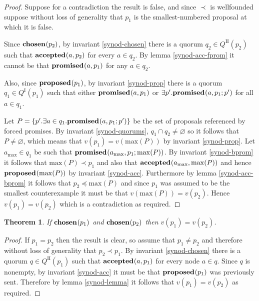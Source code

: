 \documentclass[journal]{IEEEtran}
\newtheorem{theorem}{Theorem}
\begin{document}
\begin{proof}Suppose for a contradiction the result is false, and since $\prec$
is wellfounded suppose without loss of generality that $p_1$ is the
smallest-numbered proposal at which it is false.

Since $\mathbf{chosen}_{}(p_2)$, by invariant \ref{synod-chosen} there is a quorum $q_2
\in Q^\textrm{II}(p_2)$ such that $\mathbf{accepted}_{}(a,p_2)$ for every $a \in q_2$. By
lemma \ref{synod-acc-fprom} it cannot be that $\mathbf{promised}_{}(a,p_1)$ for any $a \in
q_2$.

Also, since $\mathbf{proposed}_{}(p_1)$, by invariant \ref{synod-prop} there is a quorum $q_1
\in Q^\textrm{I}(p_1)$ such that either $\mathbf{promised}_{}(a,p_1)$ or $\exists p'.
\mathbf{promised}_{}(a,p_1;p')$ for all $a \in q_1$.

Let $P = \{ p'. \exists a \in q_1.  \mathbf{promised}_{}(a,p_1;p') \}$ be the set of
proposals referenced by forced promises. By invariant \ref{synod-quorums}, $q_1
\cap q_2 \ne \varnothing$ so it follows that $P \ne \varnothing$, which means
that $v(p_1) = v(\mathrm{max}(P))$ by invariant \ref{synod-prop}. Let
$a_{\mathrm{max}} \in q_1$ be such that
$\mathbf{promised}_{}(a_{\mathrm{max}},p_1;\mathrm{max}(P))$. By invariant
\ref{synod-bprom} it follows that $\mathrm{max}(P) \prec p_1$ and also that
$\mathbf{accepted}_{}(a_{\mathrm{max}},\mathrm{max}(P))$ and hence $\mathbf{proposed}_{}(\mathrm{max}(P))$ by
invariant \ref{synod-acc}. Furthermore by lemma \ref{synod-acc-bprom} it
follows that $p_2 \preceq \mathrm{max}(P)$ and since $p_1$ was assumed to be
the smallest counterexample it must be that $v(\mathrm{max}(P)) = v(p_2)$.
Hence $v(p_1) = v(p_2)$ which is a contradiction as required.  \end{proof}

\begin{theorem}\label{synod-safety-theorem} If $\mathbf{chosen}_{}(p_1)$ and
$\mathbf{chosen}_{}(p_2)$ then $v(p_1) = v(p_2)$.  \end{theorem}

\begin{proof} If $p_1 = p_2$ then the result is clear, so assume that $p_1 \ne
p_2$ and therefore without loss of generality that $p_2 \prec p_1$. By
invariant \ref{synod-chosen} there is a quorum $q \in Q^\textrm{II}(p_1)$ such
that $\mathbf{accepted}_{}(a,p_1)$ for every node $a \in q$. Since $q$ is nonempty, by
invariant \ref{synod-acc} it must be that $\mathbf{proposed}_{}(p_1)$ was previously sent.
Therefore by lemma \ref{synod-lemma} it follows that $v(p_1) = v(p_2)$ as
required.  \end{proof}
\end{document}
